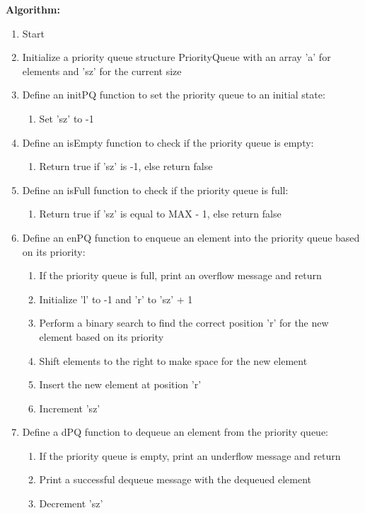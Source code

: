 \documentclass{article}
\begin{document}
\textbf{Algorithm:}
\begin{enumerate}
  \item Start
  \item Initialize a priority queue structure PriorityQueue with an array 'a' for elements and 'sz' for the current size
  \item Define an initPQ function to set the priority queue to an initial state:
    \begin{enumerate}
      \item Set 'sz' to -1
    \end{enumerate}
  \item Define an isEmpty function to check if the priority queue is empty:
    \begin{enumerate}
      \item Return true if 'sz' is -1, else return false
    \end{enumerate}
  \item Define an isFull function to check if the priority queue is full:
    \begin{enumerate}
      \item Return true if 'sz' is equal to MAX - 1, else return false
    \end{enumerate}
  \item Define an enPQ function to enqueue an element into the priority queue based on its priority:
    \begin{enumerate}
      \item If the priority queue is full, print an overflow message and return
      \item Initialize 'l' to -1 and 'r' to 'sz' + 1
      \item Perform a binary search to find the correct position 'r' for the new element based on its priority
      \item Shift elements to the right to make space for the new element
      \item Insert the new element at position 'r'
      \item Increment 'sz'
    \end{enumerate}
  \item Define a dPQ function to dequeue an element from the priority queue:
    \begin{enumerate}
      \item If the priority queue is empty, print an underflow message and return
      \item Print a successful dequeue message with the dequeued element
      \item Decrement 'sz'

\end{enumerate}
\end{enumerate}
\end{document}
